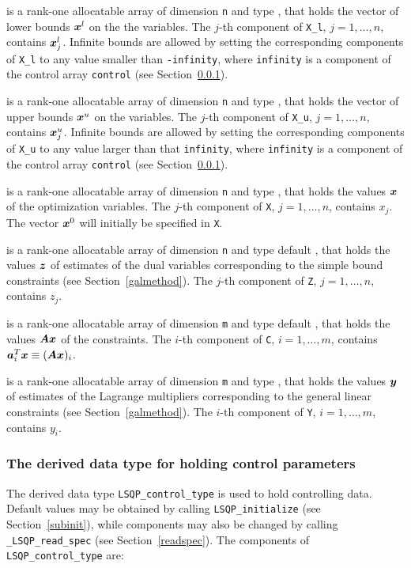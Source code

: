 \documentclass{galahad}
\newcommand{\packagename}{LSQP}
\newcommand{\fullpackagename}{\libraryname\_\-\packagename}
\begin{document}
\begin{description}
 is a rank-one allocatable array of dimension {\tt n} and type 
\realdp, that holds
the vector of lower bounds ${\bm{x}}^{l}$ on the the variables.
The $j$-th component of {\tt X\_l}, $j = 1, \ldots , n$, 
contains ${\bm{x}}_{j}^{l}$.
Infinite bounds are allowed by setting the corresponding 
components of {\tt X\_l} to any value smaller than {\tt -infinity}, 
where {\tt infinity} is a component of the control array {\tt control} 
(see Section~\ref{typecontrol}).

 is a rank-one allocatable array of dimension {\tt n} and type 
\realdp, that holds
the vector of upper bounds ${\bm{x}}^{u}$ on the variables.
The $j$-th component of {\tt X\_u}, $j = 1, \ldots , n$, 
contains ${\bm{x}}_{j}^{u}$.
Infinite bounds are allowed by setting the corresponding 
components of {\tt X\_u} to any value larger than that {\tt infinity}, 
where {\tt infinity} is a component of the control array {\tt control} 
(see Section~\ref{typecontrol}).

 is a rank-one allocatable array of dimension {\tt n} and type 
\realdp, 
that holds the values ${\bm{x}}$ of the optimization variables.
The $j$-th component of {\tt X}, $j = 1,  \ldots , n$, contains $x_{j}$.  
The vector ${\bm{x}}^{0}$ will initially be specified in {\tt X}.

 is a rank-one allocatable array of dimension {\tt n} and type default 
\realdp, that holds
the values ${\bm{z}}$ of estimates  of the dual variables 
corresponding to the simple bound constraints (see Section~\ref{galmethod}).
The $j$-th component of {\tt Z}, $j = 1,  \ldots ,  n$, contains $z_{j}$.  

 is a rank-one allocatable array of dimension {\tt m} and type default 
\realdp, that holds
the values ${\bm{A}} {\bm{x}}$ of the constraints.
The $i$-th component of {\tt C}, $i = 1,  \ldots ,  m$, contains 
${\bm{a}}_{i}^{T}{\bm{x}} \equiv ({\bm{A}} {\bm{x}})_{i}$.  

 is a rank-one allocatable array of dimension {\tt m} and type 
\realdp, that holds
the values ${\bm{y}}$ of estimates  of the Lagrange multipliers
corresponding to the general linear constraints (see Section~\ref{galmethod}).
The $i$-th component of {\tt Y}, $i = 1,  \ldots ,  m$, contains $y_{i}$.  

\end{description}


\subsubsection{The derived data type for holding control 
 parameters}\label{typecontrol}
The derived data type 
{\tt \packagename\_control\_type} 
is used to hold controlling data. Default values may be obtained by calling 
{\tt \packagename\_initialize}
(see Section~\ref{subinit}),
while components may also be changed by calling 
{\tt \fullpackagename\_read\-\_spec}
(see Section~\ref{readspec}). 
The components of 
{\tt \packagename\_control\_type} 
are:
\end{document}
